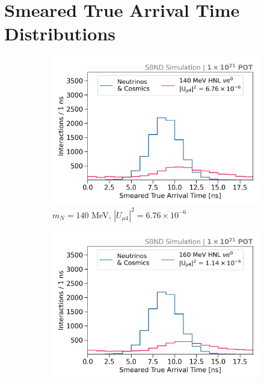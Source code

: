 
\chapter{Smeared True Arrival Time Distributions} 
\label{appendix_smeared}
\ifpdf
    \graphicspath{{Appendix6/Figs/Raster/}{Appendix6/Figs/PDF/}{Appendix6/Figs/}}
\else
    \graphicspath{{Appendix6/Figs/Vector/}{Appendix6/Figs/}}
\fi

\begin{figure}[htbp!]
        \begin{subfigure}[b]{0.495\textwidth}
            \includegraphics[width=\textwidth]{m140}
            \caption{$m_N = 140$ MeV, $|U_{\mu4}|^2 = 6.76 \times 10^{-6}$ }
        \end{subfigure}
        \begin{subfigure}[b]{0.495\textwidth}
            \includegraphics[width=\textwidth]{m160}

\end{subfigure}
\end{figure}
